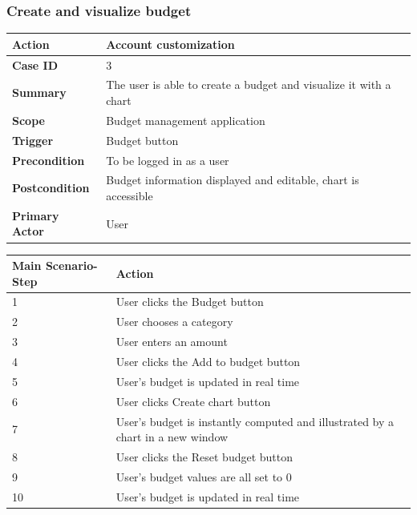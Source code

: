 \documentclass[letterpaper]{article}
\begin{document}
		\subsubsection{Create and visualize budget}
		
		\begin{center}
			\begin{tabular}{ | m{3.5cm} | m{7.5cm}| } 
				\hline
				\textbf{Action} & Account customization \\ 
				\hline
				\textbf{Case ID} & 3 \\ 
				\hline
				\textbf{Summary} & The user is able to create a budget and visualize it with a chart \\
				\hline
				\textbf{Scope} & Budget management application \\ 
				\hline
				\textbf{Trigger} & Budget button \\
				\hline
				\textbf{Precondition} & To be logged in as a user \\ 
				\hline
				\textbf{Postcondition} & Budget information displayed and editable, chart is accessible \\ 
				\hline
				\textbf{Primary Actor} & User \\ 
				\hline
			\end{tabular}
		
			\vspace{2mm}
		
			\begin{tabular}{ | m{3.5cm} | m{7.5cm}| } 
				\hline
				\textbf{Main Scenario-Step} & \textbf{Action} \\ 
				\hline
				1 & User clicks the Budget button \\ 
				\hline
				2 & User chooses a category \\ 
				\hline
				3 & User enters an amount \\ 
				\hline
				4 & User clicks the Add to budget button \\ 
				\hline
				5 & User's budget is updated in real time \\ 
				\hline
				6 & User clicks Create chart button \\ 
				\hline
				7 & User's budget is instantly computed and illustrated by a chart in a new window \\ 
				\hline
				8 & User clicks the Reset budget button \\ 
				\hline
				9 & User's budget values are all set to 0 \\
				\hline
				10 & User's budget is updated in real time \\  
				\hline
			\end{tabular}
		\end{center}
	
\end{document}
